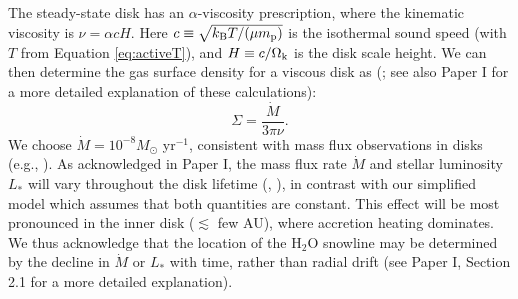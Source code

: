 \documentclass[apj]{emulateapj}
\begin{document}
The steady-state disk has an $\alpha$-viscosity prescription, where the kinematic viscosity is $\nu=\alpha c H$. Here $c \equiv \sqrt{k_{\rm B} T /(\mu m_{\rm p})}$ is the isothermal sound speed (with $T$ from Equation \ref{eq:activeT}), and $H \equiv c/\Omega_{\rm k}$ is the disk scale height. We can then determine the gas surface density for a viscous disk as (\citealt{shakura73}; see also Paper I for a more detailed explanation of these calculations):
\begin{equation}
\label{eq:Sigmaact}
\Sigma=\frac{\dot{M}}{3 \pi \nu}.
\end{equation}
We choose $\dot{M}=10^{-8} M_{\odot}$ yr$^{-1}$, consistent with mass flux observations in disks (e.g., \citealt{andrews10}). As acknowledged in Paper I, the mass flux rate $\dot{M}$ and stellar luminosity $L_*$ will vary throughout the disk lifetime (\citealt{kennedy06}, \citealt{chambers09}), in contrast with our simplified model which assumes that both quantities are constant. This effect will be most pronounced in the inner disk ($\lesssim$ few AU), where accretion heating dominates. We thus acknowledge that the location of the H$_2$O snowline may be determined by the decline in $\dot{M}$ or $L_*$ with time, rather than radial drift (see Paper I, Section 2.1 for a more detailed explanation). 

%
\end{document}

